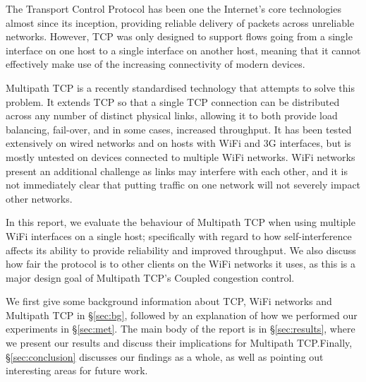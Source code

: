The Transport Control Protocol has been one the Internet's core technologies
almost since its inception, providing reliable delivery of packets across
unreliable networks. However, TCP was only designed to support flows going from
a single interface on one host to a single interface on another host, meaning
that it cannot effectively make use of the increasing connectivity of modern
devices.

Multipath TCP is a recently standardised technology that attempts to solve this
problem. It extends TCP so that a single TCP connection can be distributed
across any number of distinct physical links, allowing it to both provide load
balancing, fail-over, and in some cases, increased throughput. It has been
tested extensively on wired networks and on hosts with WiFi and 3G interfaces,
but is mostly untested on devices connected to multiple WiFi networks. WiFi
networks present an additional challenge as links may interfere with each other,
and it is not immediately clear that putting traffic on one network will not
severely impact other networks.

In this report, we evaluate the behaviour of Multipath TCP when using multiple
WiFi interfaces on a single host; specifically with regard to how
self-interference affects its ability to provide reliability and improved
throughput. We also discuss how fair the protocol is to other clients on the
WiFi networks it uses, as this is a major design goal of Multipath TCP's Coupled
congestion control.

We first give some background information about TCP, WiFi networks and Multipath
TCP in \S\ref{sec:bg}, followed by an explanation of how we performed our
experiments in \S\ref{sec:met}. The main body of the report is in
\S\ref{sec:results}, where we present our results and discuss their implications
for Multipath TCP.\@ Finally, \S\ref{sec:conclusion} discusses our findings as a
whole, as well as pointing out interesting areas for future work.
